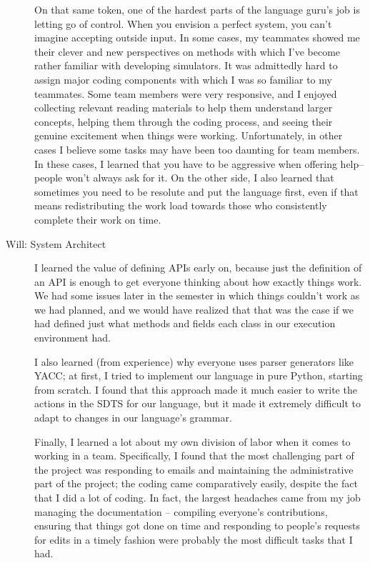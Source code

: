 \begin{description}
  On that same token, one of the hardest parts of the language guru's
  job is letting go of control. When you envision a perfect system,
  you can't imagine accepting outside input. In some cases, my
  teammates showed me their clever and new perspectives on methods
  with which I've become rather familiar with developing
  simulators. It was admittedly hard to assign major coding components
  with which I was so familiar to my teammates. Some team members were
  very responsive, and I enjoyed collecting relevant reading materials
  to help them understand larger concepts, helping them through the
  coding process, and seeing their genuine excitement when things were
  working. Unfortunately, in other cases I believe some tasks may have
  been too daunting for team members. In these cases, I learned that
  you have to be aggressive when offering help--people won't always
  ask for it. On the other side, I also learned that sometimes you
  need to be resolute and put the language first, even if that means
  redistributing the work load towards those who consistently complete
  their work on time.

\item[Will: System Architect] I learned the value of defining APIs
  early on, because just the definition of an API is enough to get
  everyone thinking about how exactly things work. We had some issues
  later in the semester in which things couldn't work as we had
  planned, and we would have realized that that was the case if we had
  defined just what methods and fields each class in our execution
  environment had.

  I also learned (from experience) why everyone uses parser generators
  like YACC; at first, I tried to implement our language in pure
  Python, starting from scratch. I found that this approach made it
  much easier to write the actions in the SDTS for our language, but
  it made it extremely difficult to adapt to changes in our language's
  grammar.

  Finally, I learned a lot about my own division of labor when it
  comes to working in a team. Specifically, I found that the most
  challenging part of the project was responding to emails and
  maintaining the administrative part of the project; the coding came
  comparatively easily, despite the fact that I did a lot of
  coding. In fact, the largest headaches came from my job managing the
  documentation -- compiling everyone's contributions, ensuring that
  things got done on time and responding to people's requests for
  edits in a timely fashion were probably the most difficult tasks
  that I had.


\end{description}
